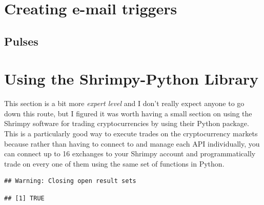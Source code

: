 \documentclass[]{book}
\begin{document}
\hypertarget{creating-e-mail-triggers}{%
\section{Creating e-mail triggers}\label{creating-e-mail-triggers}}

\hypertarget{pulses}{%
\subsection{Pulses}\label{pulses}}

\hypertarget{using-the-shrimpy-python-library}{%
\section{Using the Shrimpy-Python Library}\label{using-the-shrimpy-python-library}}

This section is a bit more \emph{expert level} and I don't really expect anyone to go down this route, but I figured it was worth having a small section on using the Shrimpy software for trading cryptocurrencies by using their Python package. This is a particularly good way to execute trades on the cryptocurrency markets because rather than having to connect to and manage each API individually, you can connect up to 16 exchanges to your Shrimpy account and programmatically trade on every one of them using the same set of functions in Python.

\begin{verbatim}
## Warning: Closing open result sets
\end{verbatim}

\begin{verbatim}
## [1] TRUE
\end{verbatim}


\end{document}
